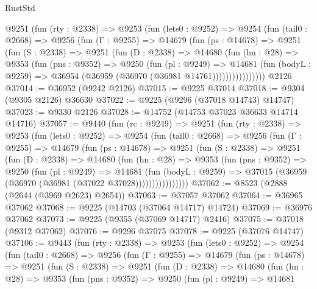 \begin{lexlean}{RustStd}
\begin{coremodule}
      @9251
        (fun (rty : @2338) =>
        @9253
          (fun (lets0 : @9252) =>
          @9254
            (fun (tail0 : @2668) =>
            @9256
              (fun (Γ : @9255) =>
              @14679
                (fun (ps : @14678) =>
                @9251
                  (fun (S : @2338) =>
                  @9251
                    (fun (D : @2338) =>
                    @14680
                      (fun (hn : @28) =>
                      @9353
                        (fun (pns : @9352) =>
                        @9250
                          (fun (pl : @9249) =>
                          @14681
                            (fun (bodyL : @9259) =>
                            @36954 (@36959 (@36970 (@36981 @14761))))))))))))))))
    @2126
@37014 := @36952 (@9242 @2126)
@37015 := @9225 @37014
@37018 := @9304 (@9305 @2126) @36630
@37022 := @9225 (@9296 (@37018 @14743) @14747)
@37023 := @9330 @2126
@37028 := @14752 (@14753 @37023 @36633 @14714 @14716)
@37057 := @9440
    (fun (rc : @9249) =>
    @9251
      (fun (rty : @2338) =>
      @9253
        (fun (lets0 : @9252) =>
        @9254
          (fun (tail0 : @2668) =>
          @9256
            (fun (Γ : @9255) =>
            @14679
              (fun (ps : @14678) =>
              @9251
                (fun (S : @2338) =>
                @9251
                  (fun (D : @2338) =>
                  @14680
                    (fun (hn : @28) =>
                    @9353
                      (fun (pns : @9352) =>
                      @9250
                        (fun (pl : @9249) =>
                        @14681
                          (fun (bodyL : @9259) =>
                          @37015 (@36959 (@36970 (@36981 (@37022 @37028))))))))))))))))
@37062 := @8523 (@2888 (@2644 (@3969 @2623) @2654))
@37063 := @37057 @37062
@37064 := @36965 @37062
@37068 := @9225 (@14703 (@37064 @14717) @14724)
@37069 := @36976 @37062
@37073 := @9225 (@9355 (@37069 @14717) @2416)
@37075 := @37018 (@9312 @37062)
@37076 := @9296 @37075
@37078 := @9225 (@37076 @14747)
@37106 := @9443
    (fun (rty : @2338) =>
    @9253
      (fun (lets0 : @9252) =>
      @9254
        (fun (tail0 : @2668) =>
        @9256
          (fun (Γ : @9255) =>
          @14679
            (fun (ps : @14678) =>
            @9251
              (fun (S : @2338) =>
              @9251
                (fun (D : @2338) =>
                @14680
                  (fun (hn : @28) =>
                  @9353
                    (fun (pns : @9352) =>
                    @9250
                      (fun (pl : @9249) =>
                      @14681

\end{coremodule}
\end{lexlean}
